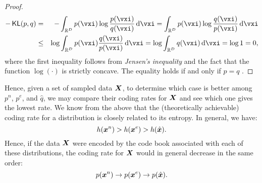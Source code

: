 \documentclass[../../book-main.tex]{subfiles}
\begin{document}
\begin{proof}
	\begin{eqnarray*}
		- \KL(p, q)
		&=& - \int_{\R^{D}} p(\vxi) \log \frac{p(\vxi)}{q(\vxi)} \odif{\vxi}
		=  \int_{\R^{D}} p(\vxi) \log \frac{q(\vxi)}{p(\vxi)} \odif{\vxi} \\
		&\le& \log \int_{\R^{D}} p(\vxi)  \frac{q(\vxi)}{p(\vxi)} \odif{\vxi} \label{eqn:jensen-KL}
		= \log \int_{\R^{D}} q(\vxi) \odif{\vxi} = \log 1 = 0,
	\end{eqnarray*}
	where the first inequality follows from {\em Jensen's inequality} and the
	fact that the function $\log(\cdot)$ is strictly concave. The equality holds
	if and only if $p = q$ .
\end{proof}

Hence, given a set of sampled data $\bm{X}$, to determine which case is better among $p^{n}$, $p^{e}$,  and $\hat{q}$, we may compare their coding rates for $\bm{X}$ and see which one gives the lowest rate. We know from the above that the (theoretically achievable) coding rate for a distribution is closely related to its entropy. In general, we have:
\begin{equation}
	h(\bm{x}^n) > h(\bm{x}^e) > h(\hat {\bm{x}}).
\end{equation}
Hence, if the data $\bm{X}$ were encoded by the code book associated with each of these distributions, the coding rate for $\bm{X}$ would in general decrease in the same order:
\begin{equation}
	p(\bm{x}^n) \rightarrow p(\bm{x}^e) \rightarrow p(\hat {\bm{x}}).
\end{equation}
\end{document}
